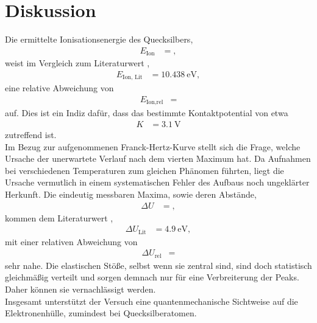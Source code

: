 \section{Diskussion}
\label{sec:Diskussion}

Die ermittelte Ionisationsenergie des Quecksilbers,
\begin{align*}
  E_{\text{Ion}} &= ,
\end{align*}
weist im Vergleich zum Literaturwert \cite{ionisationsenergie},
\begin{align*}
  E_{\text{Ion, Lit}} &= \SI{10.438}{\electronvolt},
\end{align*}
eine relative Abweichung von
\begin{align*}
  E_{\text{Ion,rel}} &= 
\end{align*}
auf.
Dies ist ein Indiz dafür, dass das bestimmte Kontaktpotential von etwa
\begin{align*}
  K &= \SI{3.1}{\volt}
\end{align*}
zutreffend ist.\\
Im Bezug zur aufgenommenen Franck-Hertz-Kurve stellt sich die Frage, welche Ursache der unerwartete Verlauf nach dem vierten Maximum hat.
Da Aufnahmen bei verschiedenen Temperaturen zum gleichen Phänomen führten, liegt die Ursache vermutlich in einem systematischen Fehler des Aufbaus noch ungeklärter Herkunft.
Die eindeutig messbaren Maxima, sowie deren Abstände,
\begin{align*}
  \Delta U &= ,
\end{align*}
kommen dem Literaturwert \cite{anregungsenergie},
\begin{align*}
  \Delta U_{\text{Lit}} &= \SI{4,9}{\electronvolt},
\end{align*}
mit einer relativen Abweichung von
\begin{align*}
  \Delta U_{\text{rel}} &= 
\end{align*}
sehr nahe.
Die elastischen Stöße, selbst wenn sie zentral sind, sind doch statistisch gleichmäßig verteilt und sorgen demnach nur für eine Verbreiterung der Peaks.
Daher können sie vernachlässigt werden.\\
Insgesamt unterstützt der Versuch eine quantenmechanische Sichtweise auf die Elektronenhülle, zumindest bei Quecksilberatomen.
